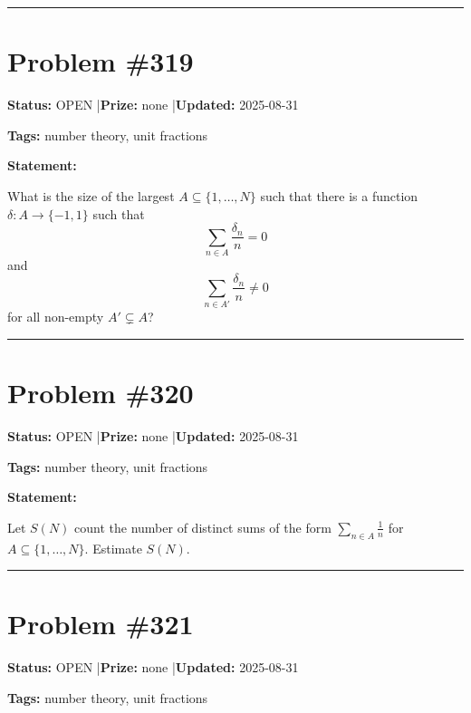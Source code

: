\documentclass{article}
\begin{document}
\noindent\rule{\linewidth}{0.4pt}


\section{Problem \#319}
\label{prob:319}

\noindent\textbf{Status:} OPEN \quad|\quad \textbf{Prize:} none \quad|\quad \textbf{Updated:} 2025-08-31

\noindent\textbf{Tags:} number theory, unit fractions

\medskip

\noindent\textbf{Statement:}

What is the size of the largest $A\subseteq \{1,\ldots,N\}$ such that there is a function $\delta:A\to \{-1,1\}$ such that\[\sum_{n\in A}\frac{\delta_n}{n}=0\]and\[\sum_{n\in A'}\frac{\delta_n}{n}\neq 0\]for all non-empty $A'\subsetneq A$?

\noindent\rule{\linewidth}{0.4pt}


\section{Problem \#320}
\label{prob:320}

\noindent\textbf{Status:} OPEN \quad|\quad \textbf{Prize:} none \quad|\quad \textbf{Updated:} 2025-08-31

\noindent\textbf{Tags:} number theory, unit fractions

\medskip

\noindent\textbf{Statement:}

Let $S(N)$ count the number of distinct sums of the form $\sum_{n\in A}\frac{1}{n}$ for $A\subseteq \{1,\ldots,N\}$. Estimate $S(N)$.

\noindent\rule{\linewidth}{0.4pt}


\section{Problem \#321}
\label{prob:321}

\noindent\textbf{Status:} OPEN \quad|\quad \textbf{Prize:} none \quad|\quad \textbf{Updated:} 2025-08-31

\noindent\textbf{Tags:} number theory, unit fractions

\medskip
\end{document}
